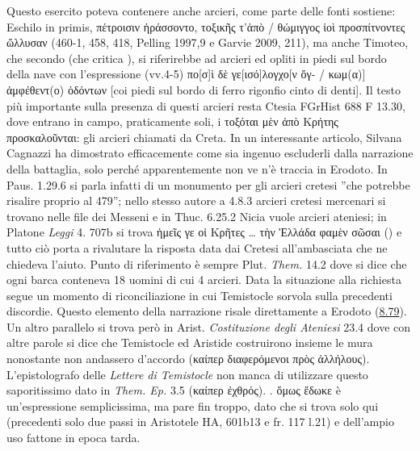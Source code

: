 {Questo esercito poteva contenere anche arcieri, come parte delle fonti sostiene: Eschilo in primis, \textgreek{πέτροισιν ἠράσσοντο, τοξικῆς τ'ἀπὸ / θώμιγγος ἰοὶ προσπίτνοντες ὤλλυσαν} (460-1, 458, 418, Pelling 1997,9 e Garvie 2009, 211), ma anche Timoteo, che secondo \cite[47]{Gambetti2001} (che critica \cite[24-30]{Janssen1984}), si riferirebbe ad arcieri ed opliti in piedi sul bordo della nave con l'espressione (vv.4-5) \textgreek{πο[σ]ὶ δὲ γε[ισό]λογχο[ν ὄγ- / κωμ(α)] ἀμφέθεντ(ο) ὀδόντων} [coi piedi sul bordo di ferro rigonfio cinto di denti]. Il testo più importante sulla presenza di questi arcieri resta Ctesia FGrHist 688 F 13.30, dove entrano in campo, praticamente soli, i \textgreek{τοξόται μὲν ἀπὸ Κρήτης προσκαλοῦνται}: gli arcieri chiamati da Creta. In un interessante articolo, Silvana Cagnazzi ha dimostrato efficacemente come sia ingenuo escluderli dalla narrazione della battaglia, solo perché apparentemente non ve n'è traccia in Erodoto. In Paus. 1.29.6 si parla infatti di un monumento per gli arcieri cretesi ''che potrebbe risalire proprio al 479''; nello stesso autore a 4.8.3 arcieri cretesi mercenari si trovano nelle file dei Messeni e in  Thuc. 6.25.2 Nicia vuole arcieri ateniesi; in Platone \emph{Leggi} 4. 707b si trova  \textgreek{ἡμεῖς γε οἱ Κρῆτες … τὴν Ἑλλάδα φαμὲν σῶσαι} (\cite[31-33]{Cagnazzi2003}) e tutto ciò porta a rivalutare la risposta data dai Cretesi all'ambasciata che ne chiedeva l'aiuto. Punto di riferimento è sempre Plut. \emph{Them.} 14.2 dove si dice che ogni barca conteneva 18 uomini di cui 4 arcieri. 
    Data la situazione alla richiesta segue un momento di riconciliazione in cui Temistocle sorvola sulla precedenti discordie. Questo elemento della narrazione risale direttamente a Erodoto (\href{http://data.perseus.org/citations/urn:cts:greekLit:tlg0016.tlg001.perseus-grc1:8.79}{8.79}). Un altro parallelo si trova però in Arist. \emph{Costituzione degli Ateniesi} 23.4 dove con altre parole si dice che Temistocle ed Aristide costruirono insieme le mura nonostante non andassero d'accordo (\textgreek{καίπερ διαφερόμενοι πρὸς ἀλλήλους}). L'epistolografo delle \emph{Lettere di Temistocle} non manca di utilizzare questo saporitissimo dato in \emph{Them. Ep.}  3.5 (\textgreek{καίπερ ἐχθρός}). \cite[132]{CulassoGastaldi1990}. \textgreek{ ὅμως ἔδωκε} è un'espressione semplicissima, ma pare fin troppo, dato che si trova solo qui (precedenti solo due passi in Aristotele HA, 601b13 e fr. 117 l.21) e dell'ampio uso fattone in epoca tarda. 
}
